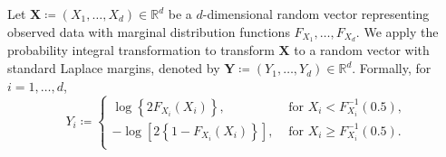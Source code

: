 \documentclass[12pt]{article}
\begin{document}
Let $\symbf{X} \coloneqq (X_1, \ldots, X_d) \in \mathbb{R}^d$ be a $d$-dimensional random vector representing observed data with marginal distribution functions $F_{X_1}, \ldots, F_{X_d}$.
We apply the probability integral transformation to transform $\symbf{X}$ to a random vector with standard Laplace margins, denoted by $\symbf{Y} \coloneqq (Y_1, \ldots, Y_d) \in \mathbb{R}^d$.
Formally, for $i = 1, \ldots, d$, 
\begin{equation}~\label{eq:laplace}
  Y_i \coloneqq \begin{cases}
    \log\left\{2F_{X_i}(X_i)\right\}, &\text{ for } X_i < F_{X_i}^{-1}(0.5), \\
    -\log\left[2\left\{ 1 - F_{X_i}(X_i)\right\} \right], &\text{ for } X_i \ge F_{X_i}^{-1}(0.5). \\
  \end{cases}
\end{equation}
\end{document}
